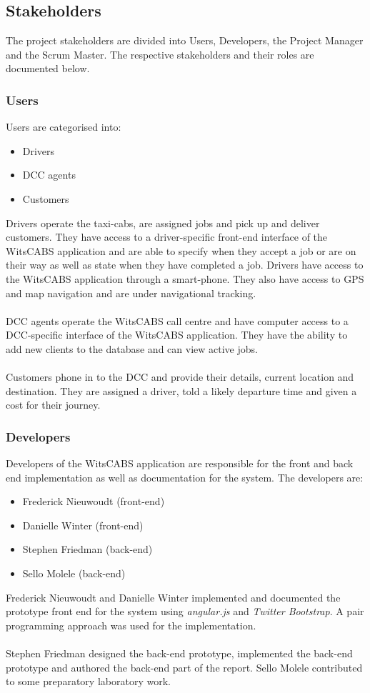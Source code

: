 \documentclass[12pt]{article}
\begin{document}
\subsection{Stakeholders}
The project stakeholders are divided into Users, Developers, the Project Manager and the Scrum Master. The respective stakeholders and their roles are documented below.
\subsubsection{Users}
Users are categorised into:
\begin{itemize}
\item Drivers
\item DCC agents
\item Customers
\end{itemize} 
Drivers operate the taxi-cabs, are assigned jobs and pick up and deliver customers. They have access to a driver-specific front-end interface of the WitsCABS application and are able to specify when they accept a job or are on their way as well as state when they have completed a job. Drivers have access to the WitsCABS application through a smart-phone. They also have access to GPS and map navigation and are under navigational tracking. \\\\

DCC agents operate the WitsCABS call centre and have computer access to a DCC-specific interface of the WitsCABS application. They have the ability to add new clients to the database and can view active jobs. \\\\

Customers phone in to the DCC and provide their details, current location and destination. They are assigned a driver, told a likely departure time and given a cost for their journey.

\subsubsection{Developers}
Developers of the WitsCABS application are responsible for the front and back end implementation as well as documentation for the system. The developers are:
\begin{itemize}
\item Frederick Nieuwoudt (front-end)
\item Danielle Winter (front-end)
\item Stephen Friedman (back-end)
\item Sello Molele (back-end)
\end{itemize} 
Frederick Nieuwoudt and Danielle Winter implemented and documented the prototype front end for the system using \textit{angular.js} and \textit{Twitter Bootstrap}. A pair programming approach was used for the implementation.\\\\
Stephen Friedman designed the back-end prototype, implemented the back-end prototype and authored the back-end part of the report. Sello Molele contributed to some preparatory laboratory work.
\end{document}
